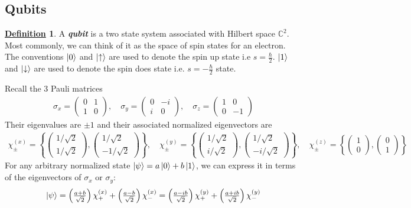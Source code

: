 \documentclass[11pt, answers]{exam}
\theoremstyle{definition}
\newtheorem{definition}{\underline{Definition}}[section]
\theoremstyle{bulleted}
\begin{document}
	\subsection{Qubits}
	\begin{definition}
		A \textit{\textbf{qubit}} is a two state system associated with Hilbert space $\mathbb{C}^2$. Most commonly, we can think of it as the space of spin states for an electron. The conventions $\ket{0}$ and $\ket{\uparrow}$ are used to denote the spin up state i.e $s=\frac{\hbar}{2}$. $\ket{1}$ and $\ket{\downarrow}$ are used to denote the spin does state i.e. $s=-\frac{\hbar}{2}$ state.
	\end{definition}
	\noindent Recall the 3 Pauli matrices
	\begin{align*}
		\sigma_x=\begin{pmatrix}0&1\\1&0\end{pmatrix},\quad
		\sigma_y=\begin{pmatrix}0&-i\\i&0\end{pmatrix},\quad
		\sigma_z=\begin{pmatrix}1&0\\0&-1\end{pmatrix}
	\end{align*}
	Their eigenvalues are $\pm 1$ and their associated normalized eigenvectors are
	\begin{align*}
		\chi_\pm^{(x)} = \left\{
		\begin{pmatrix}
			1/\sqrt{2} \\
			1/\sqrt{2}
		\end{pmatrix},
		\begin{pmatrix}
			1/\sqrt{2} \\
			-1/\sqrt{2}
		\end{pmatrix}
		\right\},\quad
		\chi_\pm^{(y)} = \left\{
		\begin{pmatrix}
			1/\sqrt{2} \\
			i/\sqrt{2}
		\end{pmatrix},
		\begin{pmatrix}
			1/\sqrt{2} \\
			-i/\sqrt{2}
		\end{pmatrix}
		\right\},\quad
		\chi_\pm^{(z)} = \left\{
		\begin{pmatrix}
			1 \\
			0
		\end{pmatrix},
		\begin{pmatrix}
			0 \\
			1
		\end{pmatrix}
		\right\}
	\end{align*}
	For any arbitrary normalized state $\ket{\psi} = a\ket{0} + b\ket{1}$, we can express it in terms of the eigenvectors of $\sigma_x$ or $\sigma_y$:
	\begin{align*}
		\ket{\psi}=\left(\tfrac{a+b}{\sqrt{2}}\right)\chi_{+}^{(x)}+\left(\tfrac{a-b}{\sqrt{2}}\right)\chi_{-}^{(x)} = \left(\tfrac{a-ib}{\sqrt{2}}\right)\chi_{+}^{(y)}+\left(\tfrac{a+ib}{\sqrt{2}}\right)\chi_{-}^{(y)}
	\end{align*}
	
\end{document}
